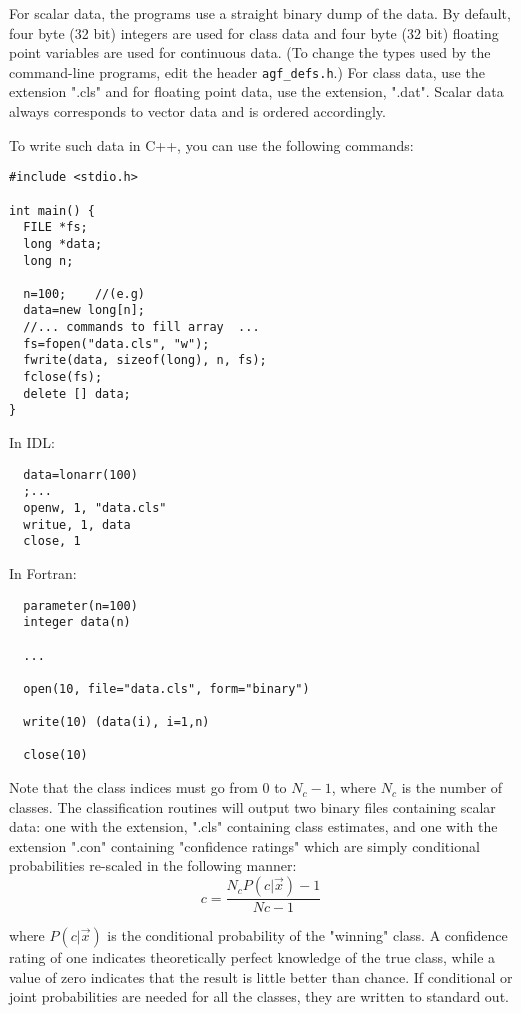 \documentclass[12pt]{article}
\begin{document}
For scalar data, the programs use a straight binary dump of the data.  By default, four byte (32 bit) integers are used for class data and four byte (32 bit) floating point variables are used for continuous data. (To change the types used by the command-line programs, edit the header \verb/agf_defs.h/.) For class data, use the extension ".cls" and for floating point data, use the extension, ".dat".  Scalar data always corresponds to vector data and is ordered accordingly.


To write such data in C++, you can use the following commands:

\begin{verbatim}
#include <stdio.h>

int main() {
  FILE *fs;
  long *data;
  long n;

  n=100;	//(e.g)
  data=new long[n];
  //... commands to fill array  ...
  fs=fopen("data.cls", "w");
  fwrite(data, sizeof(long), n, fs);
  fclose(fs);
  delete [] data;
}
\end{verbatim}

In IDL:

\begin{verbatim}
  data=lonarr(100)
  ;...
  openw, 1, "data.cls"
  writue, 1, data
  close, 1
\end{verbatim}

In Fortran:

\begin{verbatim}
  parameter(n=100)
  integer data(n)

  ...

  open(10, file="data.cls", form="binary")
 
  write(10) (data(i), i=1,n)

  close(10)
\end{verbatim}

Note that the class indices must go from 0 to $N_c-1$, where $N_c$ is the number of classes.  The classification routines will output two binary files containing scalar data:  one with the extension, ".cls" containing class estimates, and one with the extension ".con" containing "confidence ratings" which are simply conditional probabilities re-scaled in the following manner:
\begin{equation}
c = \frac{N_c P(c | \vec x) - 1}{Nc - 1}
\end{equation}

where $P(c | \vec x)$ is the conditional probability of the "winning" class.  A confidence rating of one indicates theoretically perfect knowledge of the true class, while a value of zero indicates that the result is little better than chance.  If conditional or joint probabilities are needed for all the classes, they are written to standard out.
\end{document}
